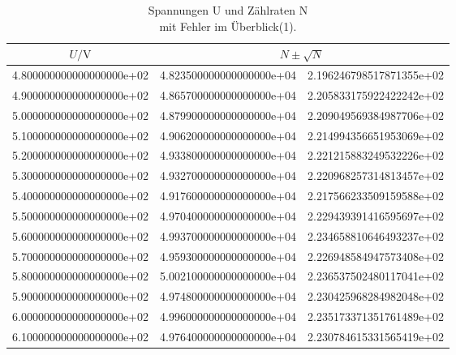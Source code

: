 \begin{table}
\parbox[t]{0.48\textwidth}{
  \centering
  \caption{Spannungen U und Zählraten N \\ mit Fehler im Überblick(1).}
  \begin{tabular}{S[scientific-notation = fixed , fixed-exponent = 0] S[scientific-notation = fixed , fixed-exponent = 0]@{$\pm\qquad$ } S[scientific-notation = fixed , fixed-exponent = 0]}
  \toprule
  $U / \si{\volt}$ &  \\
  \midrule
  4.800000000000000000e+02 & 4.823500000000000000e+04 & 2.196246798517871355e+02\\
  4.900000000000000000e+02 & 4.865700000000000000e+04 & 2.205833175922422242e+02\\
  5.000000000000000000e+02 & 4.879900000000000000e+04 & 2.209049569384987706e+02\\
  5.100000000000000000e+02 & 4.906200000000000000e+04 & 2.214994356651953069e+02\\
  5.200000000000000000e+02 & 4.933800000000000000e+04 & 2.221215883249532226e+02\\
  5.300000000000000000e+02 & 4.932700000000000000e+04 & 2.220968257314813457e+02\\
  5.400000000000000000e+02 & 4.917600000000000000e+04 & 2.217566233509159588e+02\\
  5.500000000000000000e+02 & 4.970400000000000000e+04 & 2.229439391416595697e+02\\
  5.600000000000000000e+02 & 4.993700000000000000e+04 & 2.234658810646493237e+02\\
  5.700000000000000000e+02 & 4.959300000000000000e+04 & 2.226948584947573408e+02\\
  5.800000000000000000e+02 & 5.002100000000000000e+04 & 2.236537502480117041e+02\\
  5.900000000000000000e+02 & 4.974800000000000000e+04 & 2.230425968284982048e+02\\
  6.000000000000000000e+02 & 4.996000000000000000e+04 & 2.235173371351761489e+02\\
  6.100000000000000000e+02 & 4.976400000000000000e+04 & 2.230784615331565419e+02\\

\end{tabular}}
\end{table}
